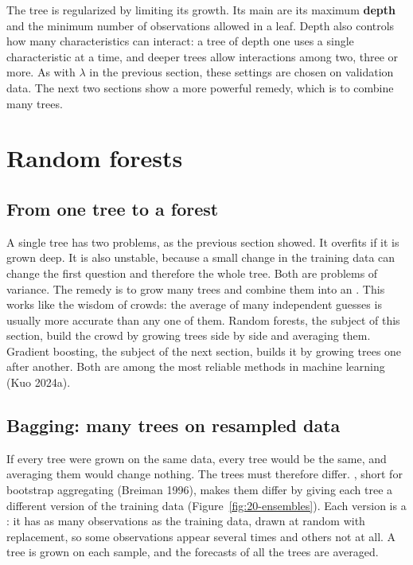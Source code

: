 The tree is regularized by limiting its growth. Its main  are its maximum \textbf{depth} and the minimum number of observations allowed in a leaf. Depth also controls how many characteristics can interact: a tree of depth one uses a single characteristic at a time, and deeper trees allow interactions among two, three or more. As with $\lambda$ in the previous section, these settings are chosen on validation data. The next two sections show a more powerful remedy, which is to combine many trees.

\section{Random forests}
\label{sec:20-rf}

\subsection{From one tree to a forest}

A single tree has two problems, as the previous section showed. It overfits if it is grown deep. It is also unstable, because a small change in the training data can change the first question and therefore the whole tree. Both are problems of variance. The remedy is to grow many trees and combine them into an . This works like the wisdom of crowds: the average of many independent guesses is usually more accurate than any one of them. Random forests, the subject of this section, build the crowd by growing trees side by side and averaging them. Gradient boosting, the subject of the next section, builds it by growing trees one after another. Both are among the most reliable methods in machine learning (Kuo 2024a).

\subsection{Bagging: many trees on resampled data}

If every tree were grown on the same data, every tree would be the same, and averaging them would change nothing. The trees must therefore differ. , short for bootstrap aggregating (Breiman 1996), makes them differ by giving each tree a different version of the training data (Figure~\ref{fig:20-ensembles}). Each version is a : it has as many observations as the training data, drawn at random with replacement, so some observations appear several times and others not at all. A tree is grown on each sample, and the forecasts of all the trees are averaged.

